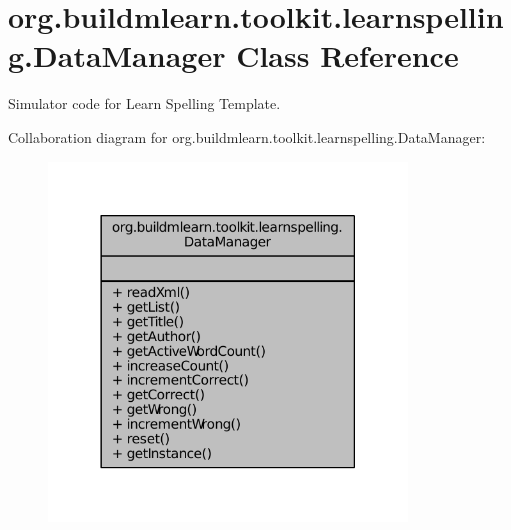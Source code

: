 \hypertarget{classorg_1_1buildmlearn_1_1toolkit_1_1learnspelling_1_1DataManager}{\section{org.\-buildmlearn.\-toolkit.\-learnspelling.\-Data\-Manager Class Reference}
\label{classorg_1_1buildmlearn_1_1toolkit_1_1learnspelling_1_1DataManager}
}


Simulator code for Learn Spelling Template.  




Collaboration diagram for org.\-buildmlearn.\-toolkit.\-learnspelling.\-Data\-Manager\-:
\nopagebreak
\begin{figure}[H]
\begin{center}
\leavevmode
\includegraphics[width=270pt]{dc/d77/classorg_1_1buildmlearn_1_1toolkit_1_1learnspelling_1_1DataManager__coll__graph}
\end{center}
\end{figure}
